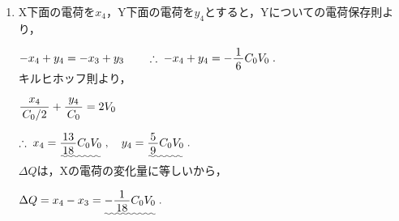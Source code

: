 ﻿\documentclass[../../../ps_a.tex]{subfiles}
\begin{document}
\begin{enumerate}
            \myspaceb%
            $\displaystyle%
                \myfracc{x_3}{C_0} + \myfracc{y_3}{C_0/2} = 2V_0
            $

            \myspaceb%
            $\displaystyle%
                \therefore \; x_3 = \uwave{\myfraca{7}{9}C_0 V_0} \;,%
                \quad y_3 = \uwave{\myfraca{11}{18}C_0 V_0} \;.
            $\\
            すると，
            
            \myspaceb%
            $\displaystyle%
                E_3 = \myfracc{x_3}{C_0 d} = \uwave{\myfracc{7V_0}{9d}} \;,
            $

            \myspaceb%
            $\displaystyle%
                \phi_3 = \uwave{2V_0} \;,%
                \quad \theta_3 = \myfracc{y_3}{C_0/2} = \uwave{\myfraca{11}{9}V_0} \;.
            $
        \item X下面の電荷を$x_4$，Y下面の電荷を$y_4$とすると，Yについての電荷保存則より，
            
            \myspaceb%
            $\displaystyle%
                -x_4 + y_4 = -x_3 + y_3%
                \qquad \therefore \; -x_4 + y_4 = -\myfraca{1}{6}C_0 V_0 \;.
            $\\
            キルヒホッフ則より，
            
            \myspaceb%
            $\displaystyle%
                \myfracc{x_4}{C_0/2} + \myfracc{y_4}{C_0} = 2V_0
            $

            \myspaceb%
            $\displaystyle%
                \therefore \; x_4 = \uwave{\myfraca{13}{18}C_0 V_0} \;,%
                \quad y_4 = \uwave{\myfraca{5}{9}C_0 V_0} \;.
            $\\
            $\Delta Q$は，Xの電荷の変化量に等しいから，
            
            \myspaceb%
            $\displaystyle%
                \Delta Q = x_4 - x_3 = \uwave{-\myfraca{1}{18}C_0 V_0} \;.
            $            
    \end{enumerate}
\end{document}
